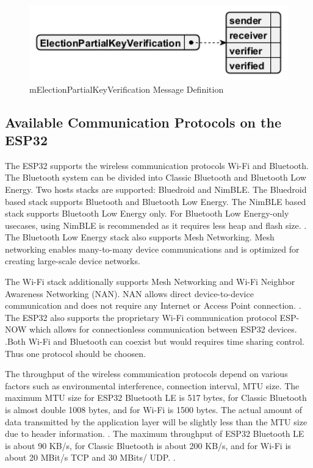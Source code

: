 \begin{figure}
    \centering
    \includegraphics[width=1\textwidth]{abbildungen/Diagramme/mElectionPartialKeyVerification.png}
    \caption{mElectionPartialKeyVerification Message Definition}
    \label{Fig:verification}
\end{figure}


\subsection{Available Communication Protocols on the ESP32}
The ESP32 supports the wireless communication protocols Wi-Fi and Bluetooth. The Bluetooth system can be divided into Classic Bluetooth and Bluetooth Low Energy. Two hosts stacks are supported: Bluedroid and NimBLE. The Bluedroid based stack supports Bluetooth and Bluetooth Low Energy. The NimBLE based stack supports Bluetooth Low Energy only. For Bluetooth Low Energy-only usecases, using NimBLE is recommended as it requires less heap and flash size. \cite{esp-prog} \cite{esp-faq}. The Bluetooth Low Energy stack also supports Mesh Networking. Mesh networking enables many-to-many device communications and is optimized for creating large-scale device networks.\cite{esp-prog}

The Wi-Fi stack additionally supports Mesh Networking and Wi-Fi Neighbor Awareness Networking (NAN). NAN allows direct device-to-device communication and does not require any Internet or Access Point connection. \cite{esp-prog}. The ESP32 also supports the proprietary Wi-Fi communication protocol ESP-NOW which allows for connectionless communication between ESP32 devices. \cite{esp-prog}.Both Wi-Fi and Bluetooth can coexist but would requires time sharing control. Thus one protocol should be choosen.

The throughput of the wireless communication protocols depend on various factors such as environmental interference, connection interval, MTU size. The maximum MTU size for ESP32 Bluetooth LE is 517 bytes, for Classic Bluetooth is almost double 1008 bytes, and for Wi-Fi is 1500 bytes. The actual amount of data transmitted by the application layer will be slightly less than the MTU size due to header information. \cite{esp-faq}. The maximum throughput of ESP32 Bluetooth LE is about 90 KB/s, for Classic Bluetooth is about 200 KB/s, and for Wi-Fi is about 20 MBit/s TCP and 30 MBits/ UDP. \cite{esp-prog} \cite{esp-faq}.



